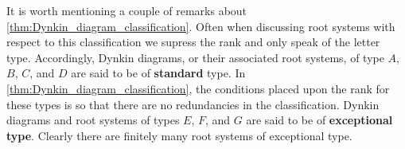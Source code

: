 \documentclass[12pt,reqno,oneside]{amsart}
\begin{document}
    It is worth mentioning a couple of remarks about \cref{thm:Dynkin_diagram_classification}. Often when discussing root systems with respect to this classification we supress the rank and only speak of the letter type. Accordingly, Dynkin diagrams, or their associated root systems, of type $A$, $B$, $C$, and $D$ are said to be of \textbf{standard} type. In \cref{thm:Dynkin_diagram_classification}, the conditions placed upon the rank for these types is so that there are no redundancies in the classification. Dynkin diagrams and root systems of types $E$, $F$, and $G$ are said to be of \textbf{exceptional type}. Clearly there are finitely many root systems of exceptional type.

    
    
\end{document}

